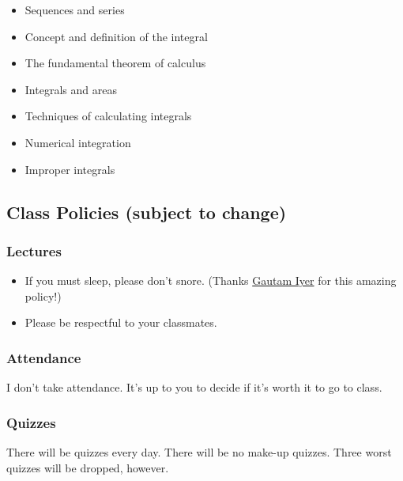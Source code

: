 \documentclass[
]{article}
\providecommand{\tightlist}{%
  \setlength{\itemsep}{0pt}\setlength{\parskip}{0pt}}
\begin{document}
\begin{itemize}
\item
  Sequences and series
\item
  Concept and definition of the integral
\item
  The fundamental theorem of calculus
\item
  Integrals and areas
\item
  Techniques of calculating integrals
\item
  Numerical integration
\item
  Improper integrals
\end{itemize}

\hypertarget{class-policies-subject-to-change}{%
\subsection*{Class Policies (subject to change)}\label{class-policies-subject-to-change}}

\hypertarget{lectures}{%
\subsubsection{Lectures}\label{lectures}}

\begin{itemize}
\tightlist
\item
  If you must sleep, please don't snore. (Thanks \href{https://www.math.cmu.edu/~gautam/}{Gautam Iyer} for this amazing policy!)
\item
  Please be respectful to your classmates.
\end{itemize}

\hypertarget{attendance}{%
\subsubsection*{Attendance}\label{attendance}}

I don't take attendance. It's up to you to decide if it's worth it to go to
class.

\hypertarget{quizzes}{%
\subsubsection*{Quizzes}\label{quizzes}}

There will be quizzes every day.
There will be no make-up quizzes.
Three worst quizzes will be dropped, however.
\end{document}
